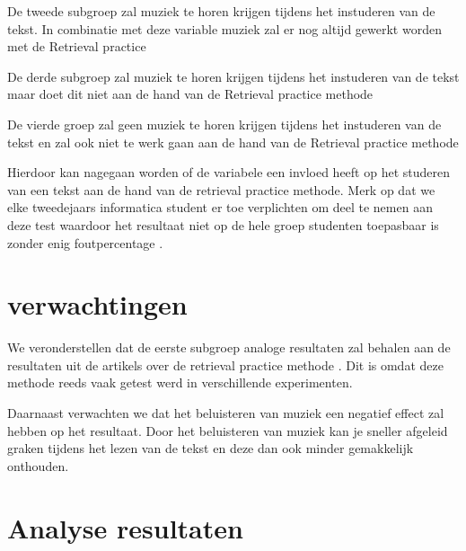 \documentclass{hogent-article}
\begin{document}
	De tweede subgroep zal muziek te horen krijgen tijdens het instuderen van de tekst. In combinatie met deze variable muziek zal er nog altijd gewerkt worden met de Retrieval practice
	
	De derde subgroep zal muziek te horen krijgen tijdens het instuderen van de tekst maar doet dit niet aan de hand van de Retrieval practice methode
	
	De vierde groep zal geen muziek te horen krijgen tijdens het instuderen van de tekst en zal ook niet te werk gaan aan de hand van de Retrieval practice methode
	
	Hierdoor kan nagegaan worden of de variabele een invloed heeft op het studeren van een tekst aan de hand van de retrieval practice methode. Merk op dat we elke tweedejaars informatica student er toe verplichten om deel te nemen aan deze test waardoor het resultaat niet op de hele groep studenten toepasbaar is zonder enig foutpercentage \autocite{karpicke2009metacognitive}.
	
	\section{verwachtingen}
	We veronderstellen dat de eerste subgroep analoge resultaten zal behalen aan de resultaten uit de artikels over de retrieval practice methode \autocite{butler2010repeated, pyc2012test, karpicke2007repeated, karpicke2008critical}. Dit is omdat deze methode reeds vaak getest werd in verschillende experimenten.
	
	Daarnaast verwachten we dat het beluisteren van muziek een negatief effect zal hebben op het resultaat. Door het beluisteren van muziek kan je sneller afgeleid graken tijdens het lezen van de tekst en deze dan ook minder gemakkelijk onthouden.
	
	\section{Analyse resultaten}
\end{document}
